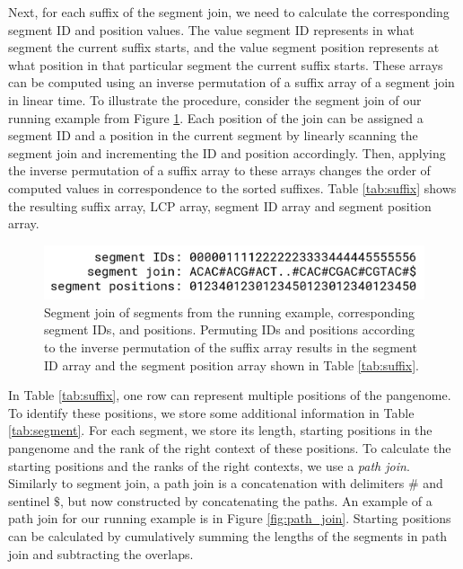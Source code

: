 Next, for each suffix of the segment join, we need to calculate the corresponding segment ID and position values.
The value segment ID represents in what segment the current suffix starts, and the value segment position represents at what position in that particular segment the current suffix starts.
These arrays can be computed using an inverse permutation of a suffix array of a segment join in linear time.
To illustrate the procedure, consider the segment join of our running example from Figure \ref{fig:ids_and_positions}.
Each position of the join can be assigned a segment ID and a position in the current segment by linearly scanning the segment join and incrementing the ID and position accordingly.
Then, applying the inverse permutation of a suffix array to these arrays changes the order of computed values in correspondence to the sorted suffixes.
Table \ref{tab:suffix} shows the resulting suffix array, LCP array,
segment ID array and segment position array.

\begin{figure}
    \centering
    \includegraphics[width=\linewidth]{images/ids_and_positions.png}
    \caption{
        Segment join of segments from the running example, corresponding segment IDs, and positions.
        Permuting IDs and positions according to the inverse permutation of the suffix array results in the segment ID array and the segment position array shown in Table \ref{tab:suffix}.
    }
    \label{fig:ids_and_positions}
\end{figure}



In Table \ref{tab:suffix}, one row can represent multiple positions of the
pangenome.
To identify these positions, we store some additional information in Table \ref{tab:segment}.
For each segment, we store its length, starting positions in the pangenome and the rank of the right context of these positions.
To calculate the starting positions and the ranks of the right contexts, we use a \emph{path join}.
Similarly to segment join, a path join is a concatenation with delimiters $\#$ and sentinel $\$$, but now constructed by concatenating the paths.
An example of a path join for our running example is in Figure \ref{fig:path_join}.
Starting positions can be calculated by cumulatively summing the lengths
of the segments in path join and subtracting the overlaps.

